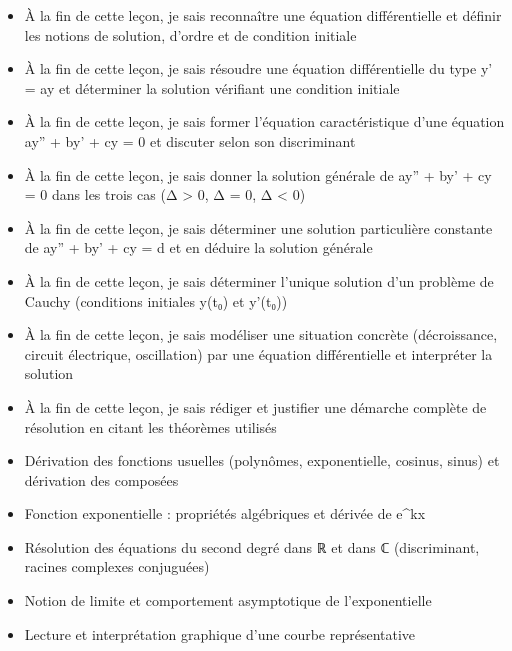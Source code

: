 \documentclass[11pt]{article}
\begin{document}
\begin{objectifs}
\begin{itemize}
\item À la fin de cette leçon, je sais reconnaître une équation différentielle et définir les notions de solution, d'ordre et de condition initiale
\item À la fin de cette leçon, je sais résoudre une équation différentielle du type y' = ay et déterminer la solution vérifiant une condition initiale
\item À la fin de cette leçon, je sais former l'équation caractéristique d'une équation ay'' + by' + cy = 0 et discuter selon son discriminant
\item À la fin de cette leçon, je sais donner la solution générale de ay'' + by' + cy = 0 dans les trois cas (Δ > 0, Δ = 0, Δ < 0)
\item À la fin de cette leçon, je sais déterminer une solution particulière constante de ay'' + by' + cy = d et en déduire la solution générale
\item À la fin de cette leçon, je sais déterminer l'unique solution d'un problème de Cauchy (conditions initiales y(t₀) et y'(t₀))
\item À la fin de cette leçon, je sais modéliser une situation concrète (décroissance, circuit électrique, oscillation) par une équation différentielle et interpréter la solution
\item À la fin de cette leçon, je sais rédiger et justifier une démarche complète de résolution en citant les théorèmes utilisés
\end{itemize}
\end{objectifs}

\begin{prerequis}
\begin{itemize}
\item Dérivation des fonctions usuelles (polynômes, exponentielle, cosinus, sinus) et dérivation des composées
\item Fonction exponentielle : propriétés algébriques et dérivée de e\^{}{kx}
\item Résolution des équations du second degré dans ℝ et dans ℂ (discriminant, racines complexes conjuguées)
\item Notion de limite et comportement asymptotique de l'exponentielle
\item Lecture et interprétation graphique d'une courbe représentative
\end{itemize}
\end{prerequis}
\end{document}
